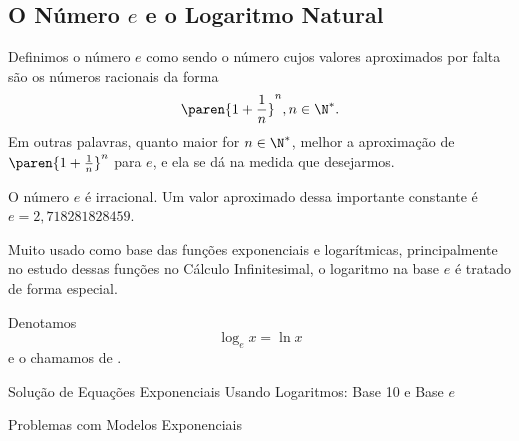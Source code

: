 \subsection{O Número $e$ e o Logaritmo Natural}

\begin{definition}
Definimos o número $e$ como sendo o número cujos valores aproximados
por falta são os números racionais da forma $$
\paren{1+ \frac 1 n}^n , n\in \N^*.$$ Em outras palavras, quanto
maior for $n \in \N^*$, melhor a aproximação de $\paren{1+ \frac
1 n}^n$ para $e$, e ela se dá na medida que desejarmos.
\end{definition}

\begin{remark}
O número $e$ é irracional. Um valor aproximado dessa importante
constante é $e = 2{,}718281828459$.
\end{remark}

Muito usado como base das funções exponenciais e logarítmicas,
principalmente no estudo dessas funções no Cálculo Infinitesimal, o
logaritmo na base $e$ é tratado de forma especial.

\begin{definition}
Denotamos $$\log_e x = \ln x$$ e o chamamos de .
\end{definition}

\begin{onlineact}
    {Solução de Equações Exponenciais Usando
Logaritmos: Base 10 e Base $e$}
\end{onlineact}

\begin{onlineact}
    {Problemas com Modelos Exponenciais}
\end{onlineact}